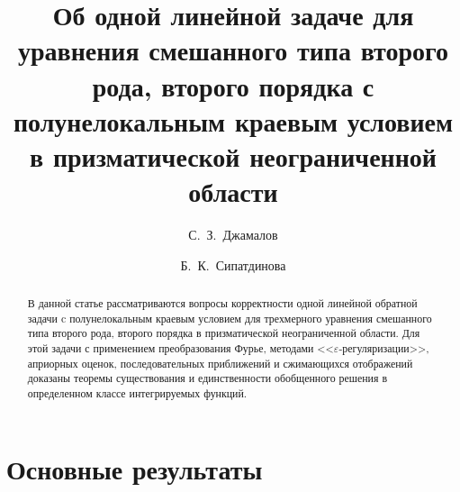 



% 

\title{Об одной линейной задаче для уравнения смешанного типа второго рода, второго порядка с полунелокальным краевым условием в призматической неограниченной области}
\author{С.~З.~Джамалов \and  Б.~К.~Сипатдинова
  \and
}


\maketitle

\begin{abstract}
В данной статье рассматриваются вопросы корректности одной линейной обратной задачи c полунелокальным краевым условием для трехмерного уравнения смешанного типа второго рода, второго порядка в призматической неограниченной области. Для этой задачи с применением преобразования Фурье, методами <<$\varepsilon$-регуляризации>>, априорных оценок, последовательных приближений и сжимающихся отображений доказаны теоремы существования и единственности обобщенного решения в определенном классе интегрируемых функций.

\end{abstract}

\section{Основные результаты} %

